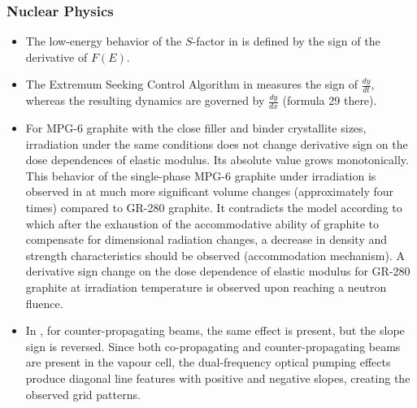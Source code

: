 \documentclass[11pt]{book}
\begin{document}
\subsubsection{Nuclear Physics}
\begin{itemize}
\item The low-energy behavior of the $S$-factor in \cite{mukhamedzhanov2002low}
is defined by the sign of the derivative of $F\left(E\right)$.
\item The Extremum Seeking Control Algorithm in \cite{agarwal2016integration}
measures the sign of $\frac{dy}{dt}$, whereas the resulting dynamics
are governed by $\frac{dy}{dx}$ (formula 29 there).
\item For MPG-6 graphite with the close filler and binder crystallite sizes,
irradiation under the same conditions does not change derivative sign
on the dose dependences of elastic modulus. Its absolute value grows
monotonically. This behavior of the \textquotedbl single-phase\textquotedbl{}
MPG-6 graphite under irradiation is observed in \cite{gurovich2019radiation}
at much more significant volume changes (approximately four times)
compared to GR-280 graphite. It contradicts the model according to
which after the exhaustion of the accommodative ability of graphite
to compensate for dimensional radiation changes, a decrease in density
and strength characteristics should be observed (accommodation mechanism).
A derivative sign change on the dose dependence of elastic modulus
for GR-280 graphite at irradiation temperature is observed upon reaching
a neutron fluence.
\item In \cite{cooper2021dual},
for counter-propagating beams, the same effect is present, but the
slope sign is reversed. Since both co-propagating and counter-propagating
beams are present in the vapour cell, the dual-frequency optical pumping
effects produce diagonal line features with positive and negative
slopes, creating the observed grid patterns.
\end{itemize}
\end{document}
